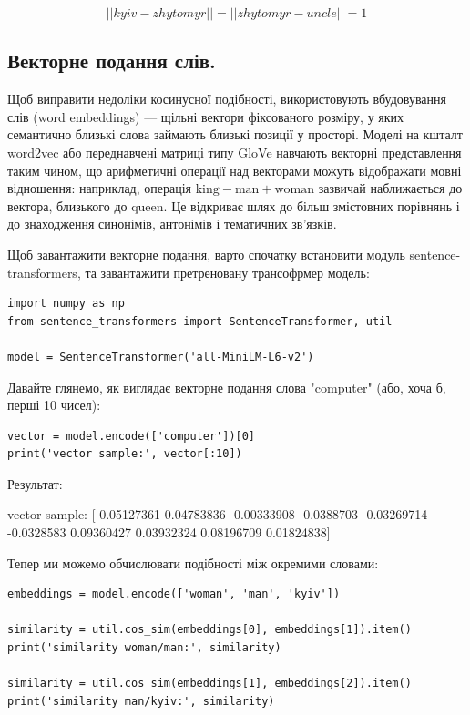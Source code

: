 $$||kyiv - zhytomyr|| = ||zhytomyr - uncle|| = 1 $$



\subsection{Векторне подання слів.}

Щоб виправити недоліки косинусної подібності, використовують вбудовування слів (word embeddings) — щільні вектори фіксованого розміру, у яких семантично близькі слова займають близькі позиції у просторі. Моделі на кшталт word2vec або переднавчені матриці типу GloVe навчають векторні представлення таким чином, що арифметичні операції над векторами можуть відображати мовні відношення: наприклад, операція $\text{king} - \text{man} + \text{woman}$ зазвичай наближається до вектора, близького до $\text{queen}$. Це відкриває шлях до більш змістовних порівнянь і до знаходження синонімів, антонімів і тематичних зв'язків.

Щоб завантажити векторне подання, варто спочатку встановити модуль sentence-transformers, та завантажити претреновану трансофрмер модель:

\begin{lstlisting}
import numpy as np
from sentence_transformers import SentenceTransformer, util

model = SentenceTransformer('all-MiniLM-L6-v2')
\end{lstlisting}

Давайте глянемо, як виглядає векторне подання слова "computer" (або, хоча б, перші 10 чисел):

\begin{lstlisting}
vector = model.encode(['computer'])[0]
print('vector sample:', vector[:10])
\end{lstlisting}

Результат:

\begin{console}
vector sample: [-0.05127361  0.04783836 -0.00333908 -0.0388703  -0.03269714 -0.0328583
  0.09360427  0.03932324  0.08196709  0.01824838]
\end{console}

Тепер ми можемо обчислювати подібності між окремими словами:

\begin{lstlisting}
embeddings = model.encode(['woman', 'man', 'kyiv'])

similarity = util.cos_sim(embeddings[0], embeddings[1]).item()
print('similarity woman/man:', similarity)

similarity = util.cos_sim(embeddings[1], embeddings[2]).item()
print('similarity man/kyiv:', similarity)
\end{lstlisting}

